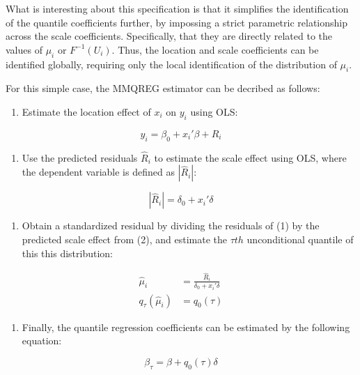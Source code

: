 \documentclass[bib]{statapress}
\providecommand{\tightlist}{%
  \setlength{\itemsep}{0pt}\setlength{\parskip}{0pt}}\usepackage{longtable,booktabs,array}
\begin{document}
What is interesting about this specification is that it simplifies the
identification of the quantile coefficients further, by impossing a
strict parametric relationship across the scale coefficients.
Specifically, that they are directly related to the values of \(\mu_i\)
or \(F^{-1}(U_i)\). Thus, the location and scale coefficients can be
identified globally, requiring only the local identification of the
distribution of \(\mu_i\).

For this simple case, the MMQREG estimator can be decribed as follows:

\begin{enumerate}
\def\labelenumi{\arabic{enumi}.}
\tightlist
\item
  Estimate the location effect of \(x_{i}\) on \(y_{i}\) using OLS:
\end{enumerate}

\[y_{i} = \beta_0 + x_{i}' \beta + R_i\]

\begin{enumerate}
\def\labelenumi{\arabic{enumi}.}
\setcounter{enumi}{1}
\tightlist
\item
  Use the predicted residuals \(\hat R_i\) to estimate the scale effect
  using OLS, where the dependent variable is defined as \(|\hat R_i|\):
\end{enumerate}

\[|\hat R_i| = \delta_0 + x_{i}' \delta\]

\begin{enumerate}
\def\labelenumi{\arabic{enumi}.}
\setcounter{enumi}{2}
\tightlist
\item
  Obtain a standardized residual by dividing the residuals of (1) by the
  predicted scale effect from (2), and estimate the \(\tau th\)
  unconditional quantile of this this distribution:
\end{enumerate}

\[\begin{aligned}
\hat \mu_i &= \frac{\hat R_i}{\delta_0 + x_{i}' \delta} \\
q_{\tau}(\hat \mu_i) &= q_0(\tau)
\end{aligned}
\]

\begin{enumerate}
\def\labelenumi{\arabic{enumi}.}
\setcounter{enumi}{3}
\tightlist
\item
  Finally, the quantile regression coefficients can be estimated by the
  following equation:
\end{enumerate}

\[\beta_{\tau} = \beta + q_0(\tau) \delta
\]
\end{document}
